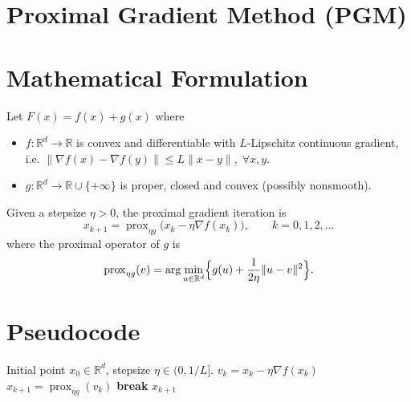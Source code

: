 \documentclass{article}
\newcommand{\prox}{\operatorname{prox}}
\begin{document}
\section*{Proximal Gradient Method (PGM)}

\section*{Mathematical Formulation}
Let $F(x)=f(x)+g(x)$ where
\begin{itemize}
  \item $f:\mathbb{R}^{d}\rightarrow\mathbb{R}$ is convex and differentiable with $L$‑Lipschitz continuous gradient, i.e. 
        $\|\nabla f(x)-\nabla f(y)\|\le L\|x-y\|,\;\forall x,y$.
  \item $g:\mathbb{R}^{d}\rightarrow\mathbb{R}\cup\{+\infty\}$ is proper, closed and convex (possibly nonsmooth).
\end{itemize}
Given a stepsize $\eta>0$, the proximal gradient iteration is
\begin{equation}
\label{eq:pgm}
x_{k+1}= \prox_{\eta g}\!\bigl(x_k-\eta \nabla f(x_k)\bigr),\qquad k=0,1,2,\dots
\end{equation}
where the proximal operator of $g$ is
\[
\prox_{\eta g}(v)=\arg\min_{u\in\mathbb{R}^{d}}\Bigl\{ g(u)+\frac{1}{2\eta}\|u-v\|^{2}\Bigr\}.
\]

\section*{Pseudocode}
\begin{algorithm}[H]
\caption{Proximal Gradient Method}
\begin{algorithmic}[1]
\REQUIRE Initial point $x_{0}\in\mathbb{R}^{d}$, stepsize $\eta\in(0,1/L]$.
    \STATE $v_{k}=x_{k}-\eta\nabla f(x_{k})$ 
    \STATE $x_{k+1}= \prox_{\eta g}(v_{k})$ 
        \STATE \textbf{break}
    \ENDIF
\ENDFOR
\RETURN $x_{k+1}$
\end{algorithmic}
\end{algorithm}
\end{document}
